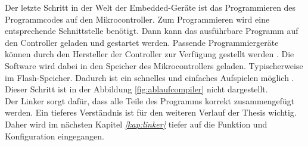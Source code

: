 Der letzte Schritt in der Welt der Embedded-Geräte ist das Programmieren des Programmcodes auf den Mikrocontroller.
Zum Programmieren wird eine entsprechende Schnittstelle benötigt.
Dann kann das ausführbare Programm auf den Controller geladen und gestartet werden.
Passende Programmiergeräte können durch den Hersteller der Controller zur Verfügung gestellt werden \cite{Wust2010-jg}.
Die Software wird dabei in den Speicher des Mikrocontrollers geladen.
Typischerweise im Flash-Speicher.
Dadurch ist ein schnelles und einfaches Aufspielen möglich \cite{Wust2010-jg}.
Dieser Schritt ist in der Abbildung \ref{fig:ablaufcompiler} nicht dargestellt. \\

Der Linker sorgt dafür, dass alle Teile des Programms korrekt zusammengefügt werden.
Ein tieferes Verständnis ist für den weiteren Verlauf der Thesis wichtig.
Daher wird im nächsten Kapitel \textit{\ref{kap:linker} } tiefer auf die Funktion und Konfiguration eingegangen.